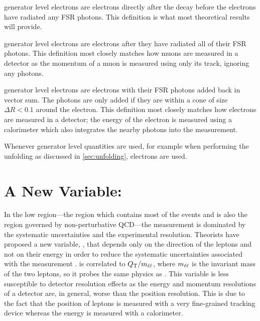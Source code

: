 \Born generator level electrons are electrons directly after the \Ztoee decay
before the electrons have radiated any FSR photons. This definition is what
most theoretical results will provide.

\Bare generator level electrons are \born electrons after they have radiated
all of their FSR photons. This definition most closely matches how muons are
measured in a detector as the momentum of a muon is measured using only its
track, ignoring any photons.

\Dressed generator level electrons are \bare electrons with their FSR photons
added back in vector sum. The photons are only added if they are within a cone
of size $\Delta R < 0.1$ around the electron. This definition most closely
matches how electrons are measured in a detector; the energy of the electron is
measured using a calorimeter which also integrates the nearby photons into the
measurement.

Whenever generator level quantities are used, for example when performing the
unfolding as discussed in \cref{sec:unfolding}, \dressed electrons are used.


\section{A New Variable: \texorpdfstring{\phistar}{Phistar}}

In the low \bosonpt region---the region which contains most of the \Z events
and is also the region governed by non-perturbative QCD---the measurement is
dominated by the systematic uncertainties and the experimental resolution.
Theorists have proposed a new variable, \phistar, that depends only on the
direction of the leptons and not on their energy in order to reduce the
systematic uncertainties associated with the measurement \cite{banfi_2011}.
\phistar is correlated to $Q_{\mathrm{T}} / m_{\ell\ell}$, where $m_{\ell\ell}$ is the invariant mass
of the two leptons, so it probes the same physics as \bosonpt. This variable is
less susceptible to detector resolution effects as the energy and momentum
resolutions of a detector are, in general, worse than the position resolution.
This is due to the fact that the position of leptons is measured with a very
fine-grained tracking device whereas the energy is measured with a calorimeter.

